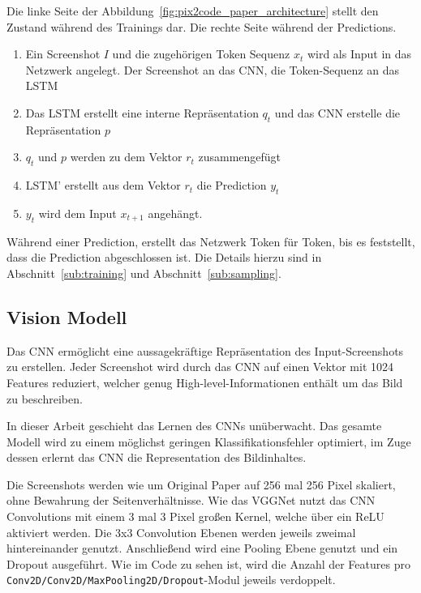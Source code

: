 \documentclass[pdftex,a4paper,halfparskip, article]{scrartcl}
\begin{document}
Die linke Seite der Abbildung~\ref{fig:pix2code_paper_architecture} stellt den Zustand während des Trainings dar. Die rechte Seite während der Predictions.

\begin{enumerate} 
\item Ein Screenshot $I$ und die zugehörigen Token Sequenz $x_t$ wird als Input in das Netzwerk angelegt. Der Screenshot an das CNN, die Token-Sequenz an das LSTM
\item Das LSTM erstellt eine interne Repräsentation $q_t$ und das CNN erstelle die Repräsentation $p$
\item $q_t$ und $p$ werden zu dem Vektor $r_t$ zusammengefügt
\item LSTM' erstellt aus dem Vektor $r_t$ die Prediction $y_t$
\item $y_t$ wird dem Input $x_{t+1}$ angehängt.
\end{enumerate}

Während einer Prediction, erstellt das Netzwerk Token für Token, bis es feststellt, dass die Prediction abgeschlossen ist. Die Details hierzu sind in Abschnitt~\ref{sub:training} und Abschnitt~\ref{sub:sampling}. 


\subsection{Vision Modell}
 
Das CNN ermöglicht eine aussagekräftige Repräsentation des Input-Screenshots zu erstellen. Jeder Screenshot wird durch das CNN auf einen Vektor mit 1024 Features reduziert, welcher genug High-level-Informationen enthält um das Bild zu beschreiben. 
 
In dieser Arbeit geschieht das Lernen des CNNs unüberwacht. Das gesamte Modell wird zu einem möglichst geringen Klassifikationsfehler  optimiert, im Zuge dessen erlernt das CNN die Representation des  Bildinhaltes. 

Die Screenshots werden wie um Original Paper auf 256 mal 256 Pixel skaliert, ohne Bewahrung der Seitenverhältnisse. Wie das VGGNet \cite{DBLP:journals/corr/SimonyanZ14a} nutzt das CNN Convolutions mit einem 3 mal 3 Pixel großen Kernel, welche über ein ReLU aktiviert werden. Die 3x3 Convolution Ebenen werden jeweils zweimal hintereinander genutzt. Anschließend wird eine Pooling Ebene genutzt und ein Dropout ausgeführt. Wie im Code zu sehen ist, wird die Anzahl der Features pro \texttt{Conv2D/Conv2D/MaxPooling2D/Dropout}-Modul jeweils verdoppelt.
\end{document}
